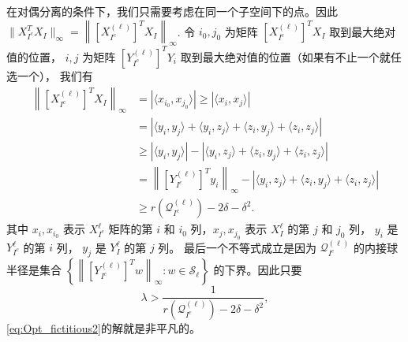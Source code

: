 \documentclass[main.tex]{subfiles}
\begin{document}
在对偶分离的条件下，我们只需要考虑在同一个子空间下的点。因此 $\|X_{I^c}^T X_I\|_{\infty} = 
\left\|[X_{I^c}^{(\ell)}]^T X_I\right\|_{\infty}$. 令 $i_0, j_0$ 为矩阵
$[X_{I^c}^{(\ell)}]^T X_I$ 取到最大绝对值的位置， $i,j$ 为矩阵
$[Y_{I^c}^{(\ell)}]^T Y_i$ 取到最大绝对值的位置（如果有不止一个就任选一个），
我们有
\begin{align}
  \left\|[X_{I^c}^{(\ell)}]^TX_I\right\|_{\infty}&=\left|\langle x_{i_0},
  x_{j_0}\rangle\right|  \geq \left|\langle x_i, x_j\rangle\right|\nonumber\\
  &= \left|\langle y_i, y_j\rangle  + \langle y_i, z_j\rangle + \langle z_i, y_j\rangle + \langle z_i, z_j\rangle\right|\nonumber\\
  &\geq \left|\langle y_i, y_j\rangle\right| - \left|\langle y_i, z_j\rangle + \langle z_i, y_j\rangle + \langle z_i, z_j\rangle\right|\nonumber\\
  & = \left\|[Y_{I^c}^{(\ell)}]^Ty_i\right\|_{\infty} - \left|\langle y_i, z_j\rangle + \langle z_i, y_j\rangle + \langle z_i, z_j\rangle\right|\nonumber\\
  &\geq r(\mathcal{Q}^{(\ell)}_{I^c}) - 2\delta - \delta^2. \label{eq:lowerbounding_max_affinity}
\end{align}
其中 $x_i, x_{i_0}$ 表示 $X_{I^c}^{\ell}$ 矩阵的第 $i$ 和 $i_0$ 列，$x_j,
x_{j_0}$ 表示 $X_I^{\ell}$ 的第 $j$ 和 $j_0$ 列， $y_i$ 是 $Y_{I^c}^{\ell}$
的第 $i$ 列， $y_j$ 是 $Y_I^{\ell}$ 的第 $j$ 列。 最后一个不等式成立是因为 $\mathcal{Q}^{(\ell)}_{I^c}$ 
的内接球半径是集合 $\left\{\left\| [ Y_{I^c}^{(\ell)}]^T w\right\|_\infty: w
\in  \mathcal{S}_{\ell}\right\} $ 的下界。因此只要
\begin{equation}\label{eq:lambda_low}
  \lambda > \frac{1}{ r(\mathcal{Q}^{(\ell)}_{I^c}) - 2\delta - \delta^2},
\end{equation}
\eqref{eq:Opt_fictitious2}的解就是非平凡的。
\end{document}
